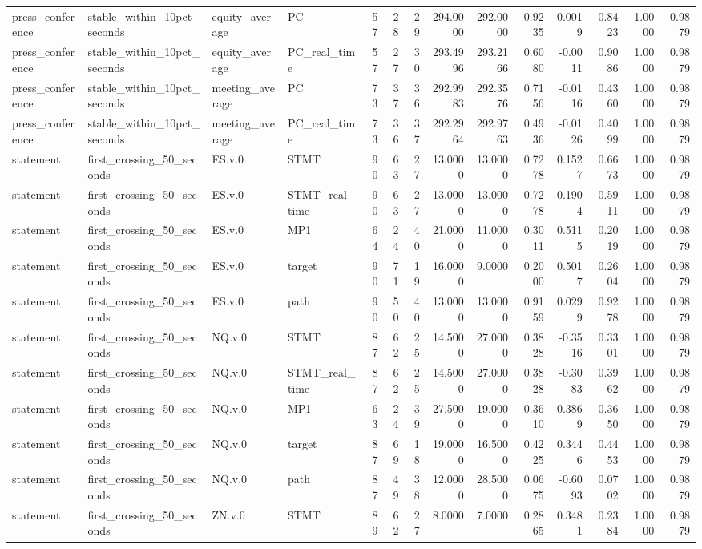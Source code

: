 \begin{tabular}{llllrrrrrrrrrr}
press_conference & stable_within_10pct_seconds & equity_average & PC & 57 & 28 & 29 & 294.0000 & 292.0000 & 0.9235 & 0.0019 & 0.8423 & 1.0000 & 0.9879 \\
press_conference & stable_within_10pct_seconds & equity_average & PC_real_time & 57 & 27 & 30 & 293.4996 & 293.2166 & 0.6080 & -0.0011 & 0.9086 & 1.0000 & 0.9879 \\
press_conference & stable_within_10pct_seconds & meeting_average & PC & 73 & 37 & 36 & 292.9983 & 292.3576 & 0.7156 & -0.0116 & 0.4360 & 1.0000 & 0.9879 \\
press_conference & stable_within_10pct_seconds & meeting_average & PC_real_time & 73 & 36 & 37 & 292.2964 & 292.9763 & 0.4936 & -0.0126 & 0.4099 & 1.0000 & 0.9879 \\
statement & first_crossing_50_seconds & ES.v.0 & STMT & 90 & 63 & 27 & 13.0000 & 13.0000 & 0.7278 & 0.1527 & 0.6673 & 1.0000 & 0.9879 \\
statement & first_crossing_50_seconds & ES.v.0 & STMT_real_time & 90 & 63 & 27 & 13.0000 & 13.0000 & 0.7278 & 0.1904 & 0.5911 & 1.0000 & 0.9879 \\
statement & first_crossing_50_seconds & ES.v.0 & MP1 & 64 & 24 & 40 & 21.0000 & 11.0000 & 0.3011 & 0.5115 & 0.2019 & 1.0000 & 0.9879 \\
statement & first_crossing_50_seconds & ES.v.0 & target & 90 & 71 & 19 & 16.0000 & 9.0000 & 0.2000 & 0.5017 & 0.2604 & 1.0000 & 0.9879 \\
statement & first_crossing_50_seconds & ES.v.0 & path & 90 & 50 & 40 & 13.0000 & 13.0000 & 0.9159 & 0.0299 & 0.9278 & 1.0000 & 0.9879 \\
statement & first_crossing_50_seconds & NQ.v.0 & STMT & 87 & 62 & 25 & 14.5000 & 27.0000 & 0.3828 & -0.3516 & 0.3301 & 1.0000 & 0.9879 \\
statement & first_crossing_50_seconds & NQ.v.0 & STMT_real_time & 87 & 62 & 25 & 14.5000 & 27.0000 & 0.3828 & -0.3083 & 0.3962 & 1.0000 & 0.9879 \\
statement & first_crossing_50_seconds & NQ.v.0 & MP1 & 63 & 24 & 39 & 27.5000 & 19.0000 & 0.3610 & 0.3869 & 0.3650 & 1.0000 & 0.9879 \\
statement & first_crossing_50_seconds & NQ.v.0 & target & 87 & 69 & 18 & 19.0000 & 16.5000 & 0.4225 & 0.3446 & 0.4453 & 1.0000 & 0.9879 \\
statement & first_crossing_50_seconds & NQ.v.0 & path & 87 & 49 & 38 & 12.0000 & 28.5000 & 0.0675 & -0.6093 & 0.0702 & 1.0000 & 0.9879 \\
statement & first_crossing_50_seconds & ZN.v.0 & STMT & 89 & 62 & 27 & 8.0000 & 7.0000 & 0.2865 & 0.3481 & 0.2384 & 1.0000 & 0.9879 \\

\end{tabular}
